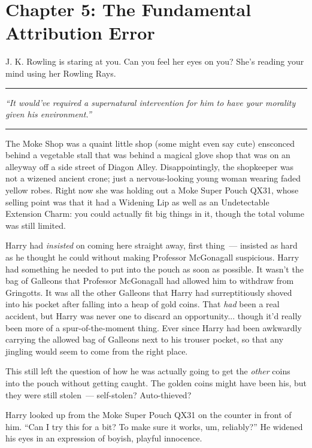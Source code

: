 \chapter{Chapter 5: The Fundamental Attribution Error}
J. K. Rowling is staring at you. Can you feel her eyes on you? She's reading your mind using her Rowling Rays.

\begin{center}\rule{3in}{0.4pt}\end{center}

\emph{``It would've required a \emph{supernatural intervention} for him to have \emph{your} morality given \emph{his} environment.''}

\begin{center}\rule{3in}{0.4pt}\end{center}

The Moke Shop was a quaint little shop (some might even say cute) ensconced behind a vegetable stall that was behind a magical glove shop that was on an alleyway off a side street of Diagon Alley. Disappointingly, the shopkeeper was not a wizened ancient crone; just a nervous-looking young woman wearing faded yellow robes. Right now she was holding out a Moke Super Pouch QX31, whose selling point was that it had a Widening Lip as well as an Undetectable Extension Charm: you could actually fit big things in it, though the total volume was still limited.

Harry had \emph{insisted} on coming here straight away, first thing~--- insisted as hard as he thought he could without making Professor McGonagall suspicious. Harry had something he needed to put into the pouch as soon as possible. It wasn't the bag of Galleons that Professor McGonagall had allowed him to withdraw from Gringotts. It was all the other Galleons that Harry had surreptitiously shoved into his pocket after falling into a heap of gold coins. That \emph{had} been a real accident, but Harry was never one to discard an opportunity... though it'd really been more of a spur-of-the-moment thing. Ever since Harry had been awkwardly carrying the allowed bag of Galleons next to his trouser pocket, so that any jingling would seem to come from the right place.

This still left the question of how he was actually going to get the \emph{other} coins into the pouch without getting caught. The golden coins might have been his, but they were still stolen~--- self-stolen? Auto-thieved?

Harry looked up from the Moke Super Pouch QX31 on the counter in front of him. ``Can I try this for a bit? To make sure it works, um, reliably?'' He widened his eyes in an expression of boyish, playful innocence.

